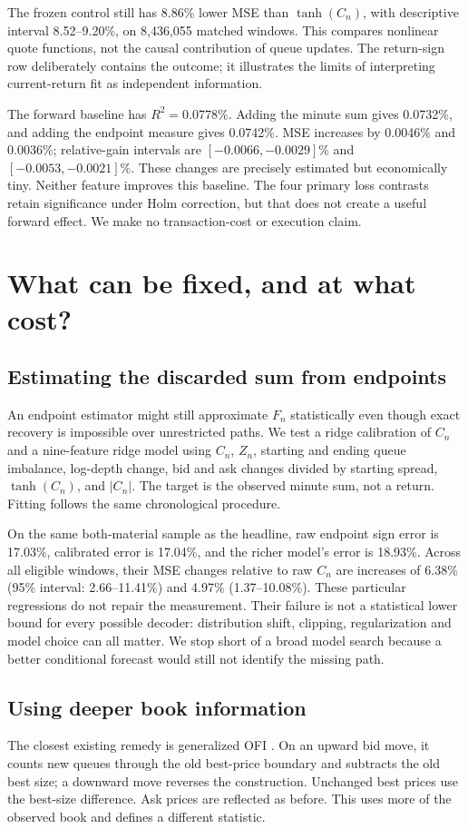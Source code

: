 \documentclass[11pt]{article}
\begin{document}
The frozen control still has 8.86\% lower MSE than $\tanh(C_n)$, with descriptive interval 8.52--9.20\%, on 8,436,055 matched windows. This compares nonlinear quote functions, not the causal contribution of queue updates. The return-sign row deliberately contains the outcome; it illustrates the limits of interpreting current-return fit as independent information.

The forward baseline has $R^2=0.0778\%$. Adding the minute sum gives 0.0732\%, and adding the endpoint measure gives 0.0742\%. MSE increases by 0.0046\% and 0.0036\%; relative-gain intervals are $[-0.0066,-0.0029]\%$ and $[-0.0053,-0.0021]\%$. These changes are precisely estimated but economically tiny. Neither feature improves this baseline. The four primary loss contrasts retain significance under Holm correction, but that does not create a useful forward effect. We make no transaction-cost or execution claim.

\section{What can be fixed, and at what cost?}
\subsection{Estimating the discarded sum from endpoints}
An endpoint estimator might still approximate $F_n$ statistically even though exact recovery is impossible over unrestricted paths. We test a ridge calibration of $C_n$ and a nine-feature ridge model using $C_n$, $Z_n$, starting and ending queue imbalance, log-depth change, bid and ask changes divided by starting spread, $\tanh(C_n)$, and $|C_n|$. The target is the observed minute sum, not a return. Fitting follows the same chronological procedure.

On the same both-material sample as the headline, raw endpoint sign error is 17.03\%, calibrated error is 17.04\%, and the richer model's error is 18.93\%. Across all eligible windows, their MSE changes relative to raw $C_n$ are increases of 6.38\% (95\% interval: 2.66--11.41\%) and 4.97\% (1.37--10.08\%). These particular regressions do not repair the measurement. Their failure is not a statistical lower bound for every possible decoder: distribution shift, clipping, regularization and model choice can all matter. We stop short of a broad model search because a better conditional forecast would still not identify the missing path.

\subsection{Using deeper book information}
The closest existing remedy is generalized OFI \citep{su}. On an upward bid move, it counts new queues through the old best-price boundary and subtracts the old best size; a downward move reverses the construction. Unchanged best prices use the best-size difference. Ask prices are reflected as before. This uses more of the observed book and defines a different statistic.
\end{document}
